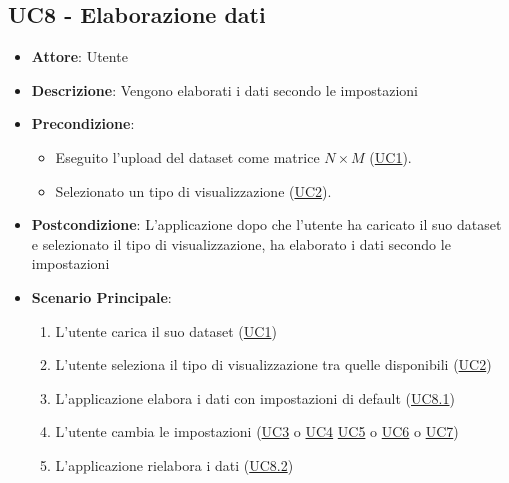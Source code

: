 \subsection{UC8 - Elaborazione dati}
    \label{uc8}
    \begin{itemize}
    \item \textbf{Attore}: Utente
    \item \textbf{Descrizione}: Vengono elaborati i dati secondo le impostazioni
    \item \textbf{Precondizione}: 
    \begin{itemize}
        \item Eseguito l'upload del dataset come matrice $N\times M$ (\hyperref[uc1]{UC1}).
        \item Selezionato un tipo di visualizzazione (\hyperref[uc2]{UC2}).
    \end{itemize}  
    \item \textbf{Postcondizione}: L'applicazione dopo che l'utente ha caricato il suo dataset e selezionato il tipo di visualizzazione, ha elaborato i dati secondo le impostazioni
    \item \textbf{Scenario Principale}: 
    \begin{enumerate}
        \item L'utente carica il suo dataset (\hyperref[uc1]{UC1})
        \item L'utente seleziona il tipo di visualizzazione tra quelle disponibili (\hyperref[uc2]{UC2})
        \item L'applicazione elabora i dati con impostazioni di default (\hyperref[uc8.1]{UC8.1})
        \item L'utente cambia le impostazioni (\hyperref[uc3]{UC3} o \hyperref[uc4]{UC4} \hyperref[uc5]{UC5} o \hyperref[uc6]{UC6} o \hyperref[uc7]{UC7})
        \item L'applicazione rielabora i dati (\hyperref[uc8.2]{UC8.2})
    \end{enumerate}
    \end{itemize}
    

